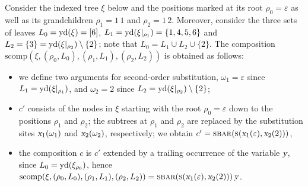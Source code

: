 \documentclass[../../document.tex]{subfiles}
\begin{document}
    \begin{example}\NoEndMark
        Consider the indexed tree \(\xi\) below and the positions marked at its root \(\rho_0 = \varepsilon\) as well as its grandchildren \(\rho_1 = 1\,1\) and \(\rho_2=1\,2\).
        Moreover, consider the three sets of leaves \(L_0 = \operatorname{yd}(\xi) = [6]\), \(L_1 = \operatorname{yd}(\xi|_{\rho_1}) = \{1,4,5,6\}\) and \(L_2 = \{3\} = \operatorname{yd}(\xi|_{\rho_2}) \setminus \{2\}\); note that \(L_0 = L_1 \cup L_2 \cup \{2\}\).
        The composition \(\mathrm{scomp}(\xi, (\rho_0, L_0), (\rho_1, L_1), (\rho_2, L_2))\) is obtained as follows:
        \begin{itemize}
            \item  we define two arguments for second-order substitution, \(\omega_1 = \varepsilon\) since \(L_1 = \operatorname{yd}(\xi|_{\rho_1})\), and \(\omega_2 = 2\) since \(L_2 = \operatorname{yd}(\xi|_{\rho_2}) \setminus \{2\}\);
            \item \(c'\) consists of the nodes in \(\xi\) starting with the root \(\rho_0 = \varepsilon\) down to the positions \(\rho_1\) and \(\rho_2\); the subtrees at \(\rho_1\) and \(\rho_2\) are replaced by the substitution sites \(\textsl{x}_1(\omega_1)\) and \(\textsl{x}_2(\omega_2)\), respectively; we obtain \(c' = \textsc{sbar}(\textsc{s} (\textsl{x}_1(\varepsilon), \textsl{x}_2(2)))\),
            \item the composition \(c\) is \(c'\) extended by a trailing occurrence of the variable \(\textsl{y}\), since \(L_0 = \operatorname{yd}(\xi_{\rho_0})\), hence \(\mathrm{scomp}(\xi, (\rho_0, L_0), (\rho_1, L_1), (\rho_2, L_2)) = \textsc{sbar}(\textsc{s} (\textsl{x}_1(\varepsilon), \textsl{x}_2(2))) \, \textsl{y}\).
        \end{itemize}
 

\end{example}
\end{document}
